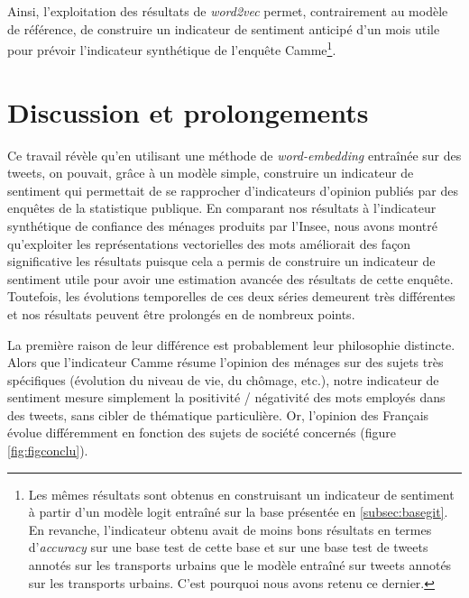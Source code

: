 \documentclass[11pt,french,french]{article}
\let\rmarkdownfootnote\footnote%
\def\footnote{\protect\rmarkdownfootnote}
\begin{document}
Ainsi, l'exploitation des résultats de \emph{word2vec} permet, contrairement au modèle de référence, de construire un indicateur de sentiment anticipé d'un mois utile pour prévoir l'indicateur synthétique de l'enquête Camme\footnote{Les mêmes résultats sont obtenus en construisant un indicateur de sentiment à partir d'un modèle logit entraîné sur la base présentée en \ref{subsec:basegit}.
  En revanche, l'indicateur obtenu avait de moins bons résultats en termes d'\emph{accuracy} sur une base test de cette base et sur une base test de tweets annotés sur les transports urbains que le modèle entraîné sur tweets annotés sur les transports urbains.
  C'est pourquoi nous avons retenu ce dernier.}.

\hypertarget{discussion-et-prolongements}{%
\section*{Discussion et prolongements}\label{discussion-et-prolongements}}

Ce travail révèle qu'en utilisant une méthode de \emph{word-embedding} entraînée sur des tweets, on pouvait, grâce à un modèle simple, construire un indicateur de sentiment qui permettait de se rapprocher d'indicateurs d'opinion publiés par des enquêtes de la statistique publique.
En comparant nos résultats à l'indicateur synthétique de confiance des ménages produits par l'Insee, nous avons montré qu'exploiter les représentations vectorielles des mots améliorait des façon significative les résultats puisque cela a permis de construire un indicateur de sentiment utile pour avoir une estimation avancée des résultats de cette enquête.
Toutefois, les évolutions temporelles de ces deux séries demeurent très différentes et nos résultats peuvent être prolongés en de nombreux points.

La première raison de leur différence est probablement leur philosophie distincte.
Alors que l'indicateur Camme résume l'opinion des ménages sur des sujets très spécifiques (évolution du niveau de vie, du chômage, etc.), notre indicateur de sentiment mesure simplement la positivité / négativité des mots employés dans des tweets, sans cibler de thématique particulière.
Or, l'opinion des Français évolue différemment en fonction des sujets de société concernés (figure \ref{fig:figconclu}).
\end{document}
